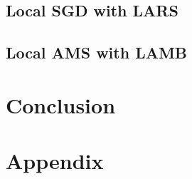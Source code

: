 \documentclass{article}
\begin{document}
\subsection{Local \textsc{SGD} with LARS}

\subsection{Local AMS with LAMB}


\section{Conclusion}\label{sec:conclusion}

\newpage





\appendix 

\section{Appendix}\label{sec:appendix}


\end{document}
